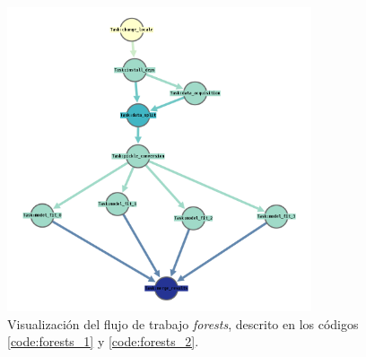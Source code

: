 \begin{figure}
\begin{center}
\includegraphics[width=0.8\textwidth]{imagenes/workflow_forests.png}
\end{center}
\caption{Visualización del flujo de trabajo \emph{forests}, descrito en los códigos \ref{code:forests_1} y \ref{code:forests_2}.}
\label{fig:workflow_forests}
\end{figure}

